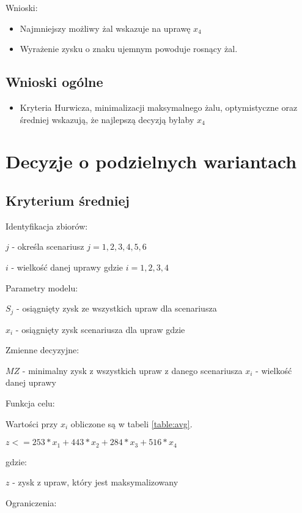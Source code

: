 \documentclass{article}
\begin{document}
Wnioski:

\begin{itemize}
  \item Najmniejszy możliwy żal wskazuje na uprawę $x_4$
  \item Wyrażenie zysku o znaku ujemnym powoduje rosnący żal.
\end{itemize}

\subsection{Wnioski ogólne}

\begin{itemize}
  \item Kryteria Hurwicza, minimalizacji maksymalnego żalu, optymistyczne oraz średniej wskazują, że najlepszą decyzją byłaby $x_4$
\end{itemize}

\newpage
\section{Decyzje o podzielnych wariantach}

\subsection{Kryterium średniej}

\noindent
Identyfikacja zbiorów:

$j$ - określa scenariusz $j = {1,2,3,4,5,6}$

$i$ - wielkość danej uprawy gdzie $i = {1,2,3,4}$

\noindent
Parametry modelu:

$S_j$ - osiągnięty zysk ze wszystkich upraw dla scenariusza

$x_i$ - osiągnięty zysk scenariusza dla upraw gdzie

\noindent
Zmienne decyzyjne:

$MZ$ - minimalny zysk z wszystkich upraw z danego scenariusza
$x_i$ - wielkość danej uprawy

\noindent
Funkcja celu:

Wartości przy $x_i$ obliczone są w tabeli \ref{table:avg}.

$z <= 253 * x_1 + 443 * x_2 + 284 * x_3 + 516 * x_4$ 

gdzie:

$z$ - zysk z upraw, który jest maksymalizowany

\noindent
Ograniczenia:
\end{document}
